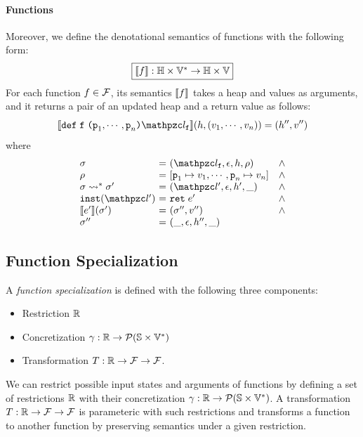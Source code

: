 \paragraph{Functions} Moreover, we define the denotational semantics of
functions with the following form:
\[
  \framebox{$\sem{\func}: \heapset \times \valset^* \rightarrow \heapset \times
  \valset$}
\]
For each function $f \in \mathcal{F}$, its semantics $\llbracket{f}\rrbracket$ takes a heap
and values as arguments, and it returns a pair of an updated heap and a return
value as follows:
\[
  \sem{\kwdef \; \varf \; \kwrl \varp_1, \cdots, \varp_n \kwrr \lab_\varf}
  (\heap, (\val_1, \cdots, \val_n)) = (\heap'', \val'')
\]
where
\[
  \begin{array}{l@{~}c@{~}ll}
    \st &=& (\lab_\varf, \epsilon, \heap, \env) &\wedge\\
    \env &=& [\varp_1 \mapsto \val_1, \cdots, \varp_n \mapsto \val_n] &\wedge\\
    \st \trans^* \st' &=& (\lab', \epsilon, \heap', \_) &\wedge\\
    \getinst(\lab') &=& \kwret \; \expr' &\wedge\\
    \sem{\expr'}(\st') &=& (\st'', \val'') &\wedge\\
    \st'' &=& (\_, \epsilon, \heap'', \_)\\
  \end{array}
\]





\subsection{Function Specialization}

A \textit{function specialization} is defined with the following three
components:
\begin{itemize}
  \item Restriction $\mathbb{R}$
  \item Concretization $\gamma: \mathbb{R} \rightarrow \mathcal{P}(\mathbb{S}
    \times \mathbb{V}^*)$
  \item Transformation $T: \mathbb{R} \rightarrow \mathcal{F}
    \rightarrow \mathcal{F}$.
\end{itemize}
We can restrict possible input states and arguments of functions by defining a
set of restrictions $\mathbb{R}$ with their concretization $\gamma:
\mathbb{R} \rightarrow \mathcal{P}(\mathbb{S} \times \mathbb{V}^*)$. A transformation
$T: \mathbb{R} \rightarrow \mathcal{F} \rightarrow \mathcal{F}$ is
parameteric with such restrictions and transforms a function to another function
by preserving semantics under a given restriction.


